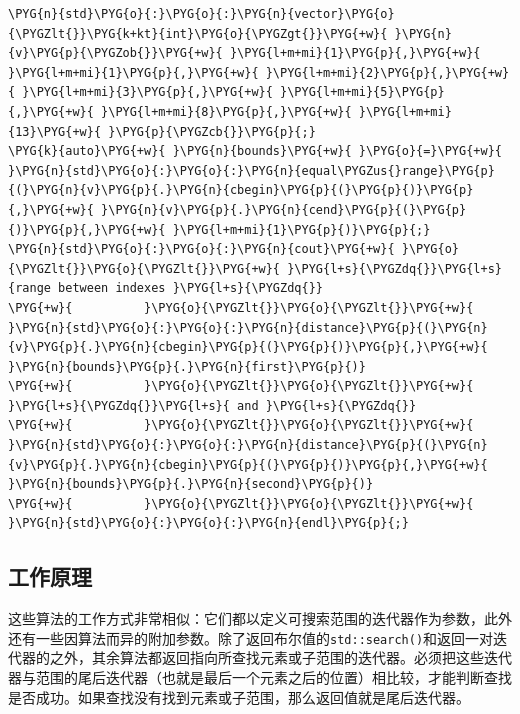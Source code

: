 \begin{itemize}
\begin{codeblockbg}
\begin{Verbatim}[commandchars=\\\{\},breaklines=true,breakanywhere=true,fontsize=\codefont,xleftmargin=17bp]
\PYG{n}{std}\PYG{o}{:}\PYG{o}{:}\PYG{n}{vector}\PYG{o}{\PYGZlt{}}\PYG{k+kt}{int}\PYG{o}{\PYGZgt{}}\PYG{+w}{ }\PYG{n}{v}\PYG{p}{\PYGZob{}}\PYG{+w}{ }\PYG{l+m+mi}{1}\PYG{p}{,}\PYG{+w}{ }\PYG{l+m+mi}{1}\PYG{p}{,}\PYG{+w}{ }\PYG{l+m+mi}{2}\PYG{p}{,}\PYG{+w}{ }\PYG{l+m+mi}{3}\PYG{p}{,}\PYG{+w}{ }\PYG{l+m+mi}{5}\PYG{p}{,}\PYG{+w}{ }\PYG{l+m+mi}{8}\PYG{p}{,}\PYG{+w}{ }\PYG{l+m+mi}{13}\PYG{+w}{ }\PYG{p}{\PYGZcb{}}\PYG{p}{;}
\PYG{k}{auto}\PYG{+w}{ }\PYG{n}{bounds}\PYG{+w}{ }\PYG{o}{=}\PYG{+w}{ }\PYG{n}{std}\PYG{o}{:}\PYG{o}{:}\PYG{n}{equal\PYGZus{}range}\PYG{p}{(}\PYG{n}{v}\PYG{p}{.}\PYG{n}{cbegin}\PYG{p}{(}\PYG{p}{)}\PYG{p}{,}\PYG{+w}{ }\PYG{n}{v}\PYG{p}{.}\PYG{n}{cend}\PYG{p}{(}\PYG{p}{)}\PYG{p}{,}\PYG{+w}{ }\PYG{l+m+mi}{1}\PYG{p}{)}\PYG{p}{;}
\PYG{n}{std}\PYG{o}{:}\PYG{o}{:}\PYG{n}{cout}\PYG{+w}{ }\PYG{o}{\PYGZlt{}}\PYG{o}{\PYGZlt{}}\PYG{+w}{ }\PYG{l+s}{\PYGZdq{}}\PYG{l+s}{range between indexes }\PYG{l+s}{\PYGZdq{}}
\PYG{+w}{          }\PYG{o}{\PYGZlt{}}\PYG{o}{\PYGZlt{}}\PYG{+w}{ }\PYG{n}{std}\PYG{o}{:}\PYG{o}{:}\PYG{n}{distance}\PYG{p}{(}\PYG{n}{v}\PYG{p}{.}\PYG{n}{cbegin}\PYG{p}{(}\PYG{p}{)}\PYG{p}{,}\PYG{+w}{ }\PYG{n}{bounds}\PYG{p}{.}\PYG{n}{first}\PYG{p}{)}
\PYG{+w}{          }\PYG{o}{\PYGZlt{}}\PYG{o}{\PYGZlt{}}\PYG{+w}{ }\PYG{l+s}{\PYGZdq{}}\PYG{l+s}{ and }\PYG{l+s}{\PYGZdq{}}
\PYG{+w}{          }\PYG{o}{\PYGZlt{}}\PYG{o}{\PYGZlt{}}\PYG{+w}{ }\PYG{n}{std}\PYG{o}{:}\PYG{o}{:}\PYG{n}{distance}\PYG{p}{(}\PYG{n}{v}\PYG{p}{.}\PYG{n}{cbegin}\PYG{p}{(}\PYG{p}{)}\PYG{p}{,}\PYG{+w}{ }\PYG{n}{bounds}\PYG{p}{.}\PYG{n}{second}\PYG{p}{)}
\PYG{+w}{          }\PYG{o}{\PYGZlt{}}\PYG{o}{\PYGZlt{}}\PYG{+w}{ }\PYG{n}{std}\PYG{o}{:}\PYG{o}{:}\PYG{n}{endl}\PYG{p}{;}
\end{Verbatim}
\end{codeblockbg}

\end{itemize}



\subsection{工作原理}



这些算法的工作方式非常相似：它们都以定义可搜索范围的迭代器作为参数，此外还有一些因算法而异的附加参数。除了返回布尔值的\texttt{std::\allowbreak{}search()}和返回一对迭代器的之外，其余算法都返回指向所查找元素或子范围的迭代器。必须把这些迭代器与范围的尾后迭代器（也就是最后一个元素之后的位置）相比较，才能判断查找是否成功。如果查找没有找到元素或子范围，那么返回值就是尾后迭代器。


